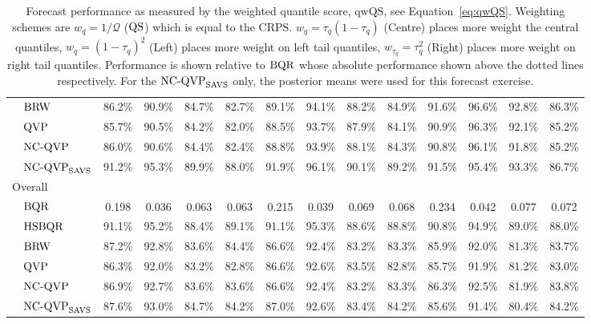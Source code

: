 \begin{table}[]
{\begin{tabular}{ll|cccc|cccc|cccc}
& $\operatorname{BRW}$  & 86.2\% & 90.9\% & 84.7\% & 82.7\% & 89.1\% & 94.1\% & 88.2\% & 84.9\% & 91.6\% & 96.6\% & 92.8\% & 86.3\% \\
& $\operatorname{QVP}$  & 85.7\% & 90.5\% & 84.2\% & 82.0\% & 88.5\% & 93.7\% & 87.9\% & 84.1\% & 90.9\% & 96.3\% & 92.1\% & 85.2\% \\
& $\operatorname{NC-QVP}$  & 86.0\% & 90.6\% & 84.4\% & 82.4\% & 88.8\% & 93.9\% & 88.1\% & 84.3\% & 90.8\% & 96.1\% & 91.8\% & 85.2\% \\
& $\operatorname{NC-QVP}_{\mathrm{SAVS}}$  & 91.2\% & 95.3\% & 89.9\% & 88.0\% & 91.9\% & 96.1\% & 90.1\% & 89.2\% & 91.5\% & 95.4\% & 93.3\% & 86.7\% \\
 \hline
\multicolumn{2}{l|}{Overall} &  &  &  &  &  &  &  &  &  &  &  &  \\
& $\operatorname{BQR}$  & 0.198 & 0.036 & 0.063 & 0.063 & 0.215 & 0.039 & 0.069 & 0.068 & 0.234 & 0.042 & 0.077 & 0.072 \\ \hdashline
& $\operatorname{HSBQR}$  & 91.1\% & 95.2\% & 88.4\% & 89.1\% & 91.1\% & 95.3\% & 88.6\% & 88.8\% & 90.8\% & 94.9\% & 89.0\% & 88.0\% \\
& $\operatorname{BRW}$  & 87.2\% & 92.8\% & 83.6\% & 84.4\% & 86.6\% & 92.4\% & 83.2\% & 83.3\% & 85.9\% & 92.0\% & 81.3\% & 83.7\% \\
& $\operatorname{QVP}$  & 86.3\% & 92.0\% & 83.2\% & 82.8\% & 86.6\% & 92.6\% & 83.5\% & 82.8\% & 85.7\% & 91.9\% & 81.2\% & 83.0\% \\
& $\operatorname{NC-QVP}$  & 86.9\% & 92.7\% & 83.6\% & 83.6\% & 86.6\% & 92.4\% & 83.2\% & 83.3\% & 86.3\% & 92.5\% & 81.9\% & 83.8\% \\
& $\operatorname{NC-QVP}_{\mathrm{SAVS}}$  & 87.6\% & 93.0\% & 84.7\% & 84.2\% & 87.0\% & 92.6\% & 83.4\% & 84.2\% & 85.6\% & 91.4\% & 80.4\% & 84.2\% \\
 \hline
\end{tabular}%
}
\caption{Forecast performance as measured by the weighted quantile score, $\mathrm{qwQS}$, see Equation~\ref{eq:qwQS}. Weighting schemes are $w_{q} = 1/\mathcal{Q}$ ($\operatorname{QS}$) which is equal to the $\mathrm{CRPS}$. $w_{q} = \tau_q(1-\tau_q)$ (Centre) places more weight the central quantiles, $w_{q} = (1-\tau_q)^2$ (Left) places more weight on left tail quantiles, $w_{\tau_q} = \tau^2_q$ (Right) places more weight on right tail quantiles. Performance is shown relative to $\operatorname{BQR}$ whose absolute performance shown above the dotted lines respectively. For the $\operatorname{NC-QVP}_{\mathrm{SAVS}}$ only, the posterior means were used for this forecast exercise.}
\label{tab:ForcRes}
\end{table}
%
